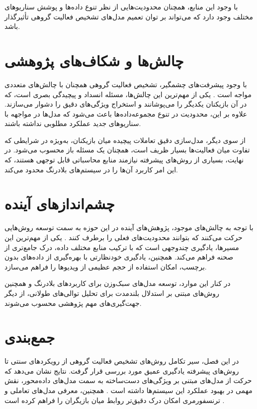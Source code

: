 \documentclass[12pt]{report}
\begin{document}
با وجود این منابع، همچنان محدودیت‌هایی از نظر تنوع داده‌ها و پوشش سناریوهای مختلف وجود دارد که می‌تواند بر توان تعمیم مدل‌های تشخیص فعالیت گروهی تأثیرگذار باشد.

\section{چالش‌ها و شکاف‌های پژوهشی}
با وجود پیشرفت‌های چشمگیر، تشخیص فعالیت گروهی همچنان با چالش‌های متعددی مواجه است \cite{twenty,twentyone}. یکی از مهم‌ترین این چالش‌ها، مسئله انسداد و پیچیدگی بصری است، که در آن بازیکنان یکدیگر را می‌پوشانند و استخراج ویژگی‌های دقیق را دشوار می‌سازند. علاوه بر این، محدودیت در تنوع مجموعه‌داده‌ها باعث می‌شود که مدل‌ها در مواجهه با سناریوهای جدید عملکرد مطلوبی نداشته باشند.

از سوی دیگر، مدل‌سازی دقیق تعاملات پیچیده میان بازیکنان، به‌ویژه در شرایطی که تفاوت میان فعالیت‌ها بسیار ظریف است، همچنان یک مسئله باز محسوب می‌شود. در نهایت، بسیاری از روش‌های پیشرفته نیازمند منابع محاسباتی قابل توجهی هستند، که این امر کاربرد آن‌ها را در سیستم‌های بلادرنگ محدود می‌کند.


\section{چشم‌اندازهای آینده}
با توجه به چالش‌های موجود، پژوهش‌های آینده در این حوزه به سمت توسعه روش‌هایی حرکت می‌کنند که بتوانند محدودیت‌های فعلی را برطرف کنند \cite{twentytwo,twentythree}. یکی از مهم‌ترین این مسیرها، یادگیری چندوجهی است که با ترکیب منابع مختلف داده، درک جامع‌تری از صحنه فراهم می‌کند. همچنین، یادگیری خودنظارتی با بهره‌گیری از داده‌های بدون برچسب، امکان استفاده از حجم عظیمی از ویدیوها را فراهم می‌سازد.

در کنار این موارد، توسعه مدل‌های سبک‌وزن برای کاربردهای بلادرنگ و همچنین روش‌های مبتنی بر استدلال بلندمدت برای تحلیل توالی‌های طولانی، از دیگر جهت‌گیری‌های مهم پژوهشی محسوب می‌شوند.


\section{جمع‌بندی}
در این فصل، سیر تکامل روش‌های تشخیص فعالیت گروهی از رویکردهای سنتی تا روش‌های پیشرفته یادگیری عمیق مورد بررسی قرار گرفت. نتایج نشان می‌دهد که حرکت از مدل‌های مبتنی بر ویژگی‌های دست‌ساخته به سمت مدل‌های داده‌محور، نقش مهمی در بهبود عملکرد این سیستم‌ها داشته است \cite{eight,ten}. همچنین، معرفی مدل‌های تعاملی و ترنسفورمری امکان درک دقیق‌تر روابط میان بازیگران را فراهم کرده است \cite{three,five,fourteen}.
\end{document}
